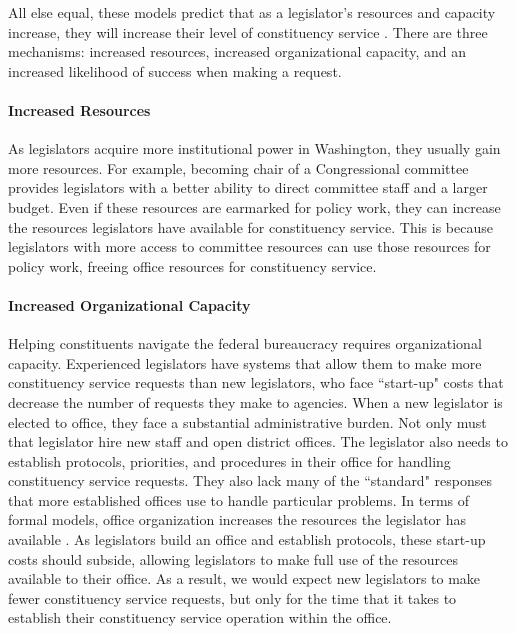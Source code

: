 \documentclass[12pt]{article}
\begin{document}

All else equal, these models predict that as a legislator's resources and capacity increase, they will increase their level of constituency service \cite[Proposition 1]{AshworthBuenodeMesquita2006}. There are three mechanisms: increased resources, increased organizational capacity, and an increased likelihood of success when making a request. 

\paragraph{Increased Resources} As legislators acquire more institutional power in Washington, they usually gain more resources. For example, becoming chair of a Congressional committee provides legislators with a better ability to direct committee staff and a larger budget. Even if these resources are earmarked for policy work, they can increase the resources legislators have available for constituency service. This is because legislators with more access to committee resources can use those resources for policy work, freeing office resources for constituency service. 




\paragraph{Increased Organizational Capacity} Helping constituents navigate the federal bureaucracy requires organizational capacity. Experienced legislators have systems that allow them to make more constituency service requests than new legislators, who face ``start-up" costs that decrease the number of requests they make to agencies. When a new legislator is elected to office, they face a substantial administrative burden. Not only must that legislator hire new staff and open district offices. The legislator also needs to establish protocols, priorities, and procedures in their office for handling constituency service requests. They also lack many of the ``standard" responses that more established offices use to handle particular problems. In terms of formal models, office organization increases the resources the legislator has available \citep{AshworthBuenodeMesquita2006}. As legislators build an office and establish protocols, these start-up costs should subside, allowing legislators to make full use of the resources available to their office. As a result, we would expect new legislators to make fewer constituency service requests, but only for the time that it takes to establish their constituency service operation within the office.   
\end{document}
